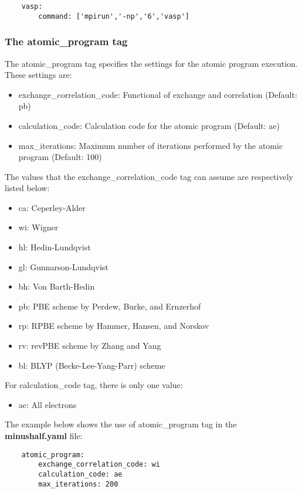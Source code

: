 \begin{verbatim}
    vasp:
        command: ['mpirun','-np','6','vasp']
  \end{verbatim}
  
 \subsubsection{The atomic\_program tag}
 The atomic\_program tag  specifies the settings for the atomic program execution. These settings are:
 
 \begin{itemize}
     \item exchange\_correlation\_code: Functional of exchange and correlation (Default: pb)
     \item calculation\_code: Calculation code for the atomic program (Default: ae)
     \item max\_iterations: Maximum number of iterations performed by the atomic program (Default: 100)
     
 \end{itemize}
 
 The values that the exchange\_correlation\_code tag can assume are respectively listed below:
 
 \begin{itemize}
     \item ca: Ceperley-Alder
     \item wi: Wigner
     \item hl: Hedin-Lundqvist
     \item gl: Gunnarson-Lundqvist
     \item bh: Von Barth-Hedin
     \item pb: PBE scheme by Perdew, Burke, and Ernzerhof
     \item rp: RPBE scheme by Hammer, Hansen, and Norskov
     \item rv: revPBE scheme by Zhang and Yang
     \item bl: BLYP (Becke-Lee-Yang-Parr) scheme
 \end{itemize}
 For calculation\_code tag, there is only one value:
  \begin{itemize}
     \item ae: All electrons
 \end{itemize}
 
The example below shows the use of atomic\_program tag in the \textbf{minushalf.yaml} file:

\begin{verbatim}
    atomic_program:
        exchange_correlation_code: wi
        calculation_code: ae
        max_iterations: 200
  \end{verbatim}
  
